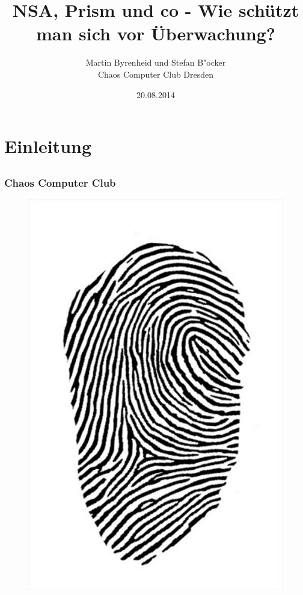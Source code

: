 \documentclass[12pt]{beamer}
\title{NSA, Prism und co - Wie schützt man sich vor Überwachung?}
\author{\small Martin Byrenheid und Stefan B"ocker\\\large Chaos Computer Club Dresden}
\date{20.08.2014}
\begin{document}
\maketitle

\section{Einleitung}
\subsection{}

\begin{frame}
  \frametitle{Chaos Computer Club}
  \begin{figure}
    \includegraphics[height=0.7\textheight]{img/fingerabdruck.jpg}
  \end{figure}
\end{frame}
\end{document}
